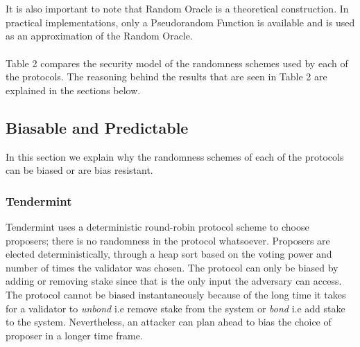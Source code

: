 \documentclass[10pt,journal,compsoc]{IEEEtran}
\begin{document}
\\\\
It is also important to note that Random Oracle is a theoretical construction. In practical implementations, only a Pseudorandom Function is available and is used as an approximation of the Random Oracle. 
\\\\
Table 2 compares the security model of the  randomness schemes used by each of the protocols. The reasoning behind the results that are seen in Table 2 are explained in the sections below.

\subsection{Biasable and Predictable}
In this section we explain why the randomness schemes of each of the protocols can be biased or are bias resistant. 
\subsubsection{Tendermint}
Tendermint uses a deterministic round-robin protocol scheme to choose proposers; there is no randomness in the protocol whatsoever. Proposers are elected deterministically, through a heap sort based on the voting power and number of times the validator was chosen. The protocol can only be biased by adding or removing stake since that is the only input the adversary can access. The protocol cannot be biased instantaneously because of the long time it takes for a validator to \emph{unbond} i.e remove stake from the system or \emph{bond} i.e add stake to the system. Nevertheless, an attacker can plan ahead to bias the choice of proposer in a longer time frame.
\end{document}
